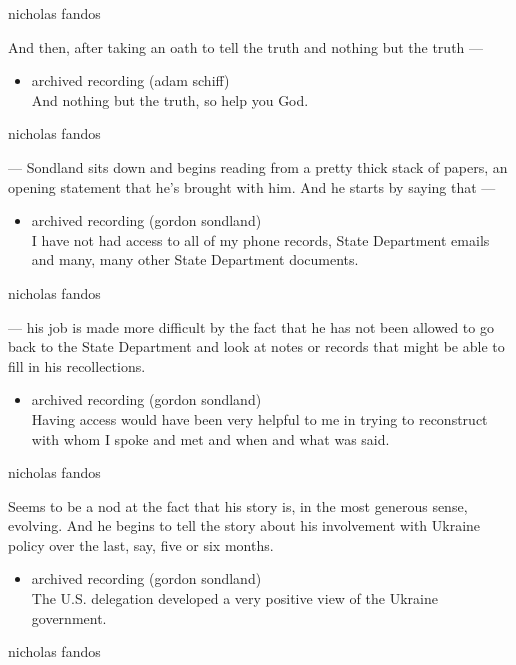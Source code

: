 nicholas fandos

And then, after taking an oath to tell the truth and nothing but the
truth ---

\begin{itemize}
\tightlist
\item
  archived recording (adam schiff)\\
  And nothing but the truth, so help you God.
\end{itemize}

nicholas fandos

--- Sondland sits down and begins reading from a pretty thick stack of
papers, an opening statement that he's brought with him. And he starts
by saying that ---

\begin{itemize}
\tightlist
\item
  archived recording (gordon sondland)\\
  I have not had access to all of my phone records, State Department
  emails and many, many other State Department documents.
\end{itemize}

nicholas fandos

--- his job is made more difficult by the fact that he has not been
allowed to go back to the State Department and look at notes or records
that might be able to fill in his recollections.

\begin{itemize}
\tightlist
\item
  archived recording (gordon sondland)\\
  Having access would have been very helpful to me in trying to
  reconstruct with whom I spoke and met and when and what was said.
\end{itemize}

nicholas fandos

Seems to be a nod at the fact that his story is, in the most generous
sense, evolving. And he begins to tell the story about his involvement
with Ukraine policy over the last, say, five or six months.

\begin{itemize}
\tightlist
\item
  archived recording (gordon sondland)\\
  The U.S. delegation developed a very positive view of the Ukraine
  government.
\end{itemize}

nicholas fandos

